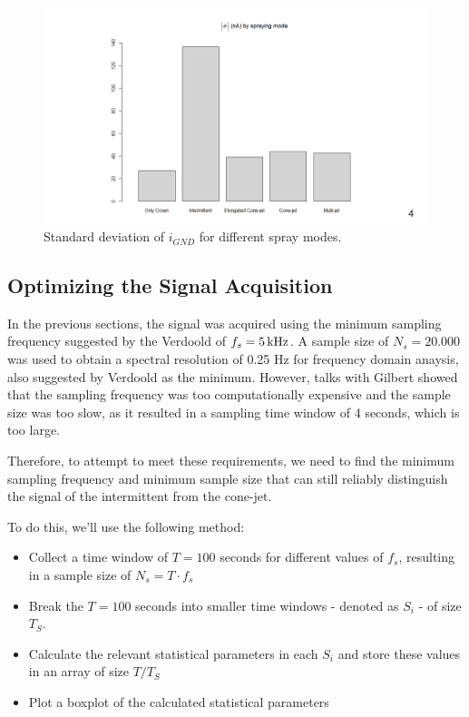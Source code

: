 \documentclass[oneside,12pt]{article}
\begin{document}
\begin{figure}[h!]
    \centering
    \includegraphics[width=1\textwidth,trim=1 1 1 1,clip]{figures/ignd-good-sd.png}
    \caption{Standard deviation of $i_{GND}$ for different spray modes.}
    \label{fig:ignd-good-sd}
\end{figure}


\subsection{Optimizing the Signal Acquisition}

In the previous sections, the signal was acquired using the minimum sampling frequency
suggested by the Verdoold of $f_s = 5 \,\mathrm{kHz}$. A sample size of $N_s = 20.000$ was used to obtain a spectral resolution of 0.25 Hz
for frequency domain anaysis, also suggested by Verdoold as the minimum. However, talks with Gilbert showed that the sampling frequency was too
computationally expensive and the sample size was too slow, as it resulted in a sampling time window of 4 seconds, which is too large.

Therefore, to attempt to meet these requirements, we need to find the minimum sampling frequency and
minimum sample size that can still reliably distinguish the signal of the intermittent from the cone-jet.

To do this, we'll use the following method:

\begin{itemize}
    \item Collect a time window of $T = 100$ seconds for different values of $f_s$, resulting in a sample size of $N_s = T \cdot f_s$
    \item Break the $T = 100$ seconds into smaller time windows - denoted as $S_i$ - of size $T_S$. 
    \item Calculate the relevant statistical parameters in each $S_i$ and store these values in an array of size $T / T_S$
    \item Plot a boxplot of the calculated statistical parameters
\end{itemize}
\end{document}
